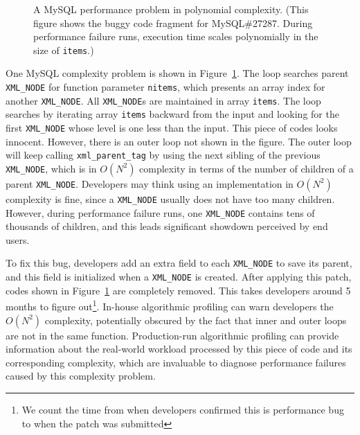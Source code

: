 \begin{figure}
\centering
{}
  \mbox{}
\caption{A MySQL performance problem in polynomial complexity. 
\footnotesize{(This figure shows the buggy code fragment for MySQL\#27287. 
   During performance failure runs, 
   execution time scales polynomially in the size of \texttt{items}.)}}
\vspace{-0.05in}
\label{fig:mysql27287}
\vspace{-0.05in}
\end{figure}


One MySQL complexity problem is shown in Figure~\ref{fig:mysql27287}.
The loop searches parent \texttt{XML\_NODE} for function parameter \texttt{nitems}, 
which presents an array index for another \texttt{XML\_NODE}.
All \texttt{XML\_NODE}s are maintained in array \texttt{items}. 
The loop searches by iterating array \texttt{items} 
backward from the input and looking for the first \texttt{XML\_NODE} 
whose level is one less than the input.
This piece of codes looks innocent. 
However, there is an outer loop not shown in the figure.
The outer loop will keep calling \texttt{xml\_parent\_tag} by using 
the next sibling of the previous \texttt{XML\_NODE}, 
which is in $O(N^2)$ complexity in terms of the number of children of a parent \texttt{XML\_NODE}. 
Developers may think using an implementation in $O(N^2)$ complexity is fine, 
since a \texttt{XML\_NODE} usually does not have too many children.
However, during performance failure runs, 
one \texttt{XML\_NODE} contains tens of thousands of children, 
and this leads significant showdown perceived by end users. 

To fix this bug, developers add an extra field to each \texttt{XML\_NODE} to save its parent, 
and this field is initialized when a \texttt{XML\_NODE} is created. 
After applying this patch, codes shown in Figure~\ref{fig:mysql27287} are completely removed.
This takes developers around 5 months to figure 
out\footnote{We count the time from when developers confirmed this is performance bug 
to when the patch was submitted}. 
In-house algorithmic profiling can warn developers the $O(N^2)$ complexity, 
potentially obscured by the fact that inner and outer loops are not in the same function. 
Production-run algorithmic profiling can provide information about the real-world workload 
processed by this piece of code and its corresponding complexity,
which are invaluable to diagnose performance failures caused by this complexity problem. 


